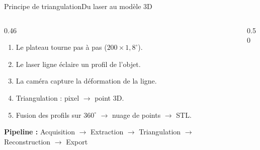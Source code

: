 \documentclass[aspectratio=169,10pt]{beamer}
\begin{document}
\begin{frame}{Principe de triangulation}{Du laser au mod\`{e}le 3D}
  \begin{columns}[T,onlytextwidth]
    \begin{column}{0.46\textwidth}
      \begin{enumerate}
        \item Le plateau tourne pas \`{a} pas ($200\times1{,}8^\circ$).
        \item Le laser ligne \'{e}claire un profil de l'objet.
        \item La cam\'{e}ra capture la d\'{e}formation de la ligne.
        \item Triangulation : pixel $\rightarrow$ point 3D.
        \item Fusion des profils sur $360^\circ$ $\rightarrow$ nuage de points $\rightarrow$ STL.
      \end{enumerate}

      \vspace{0.15cm}
      \footnotesize
      \textbf{Pipeline :} Acquisition $\rightarrow$ Extraction $\rightarrow$ Triangulation $\rightarrow$ Reconstruction $\rightarrow$ Export
    \end{column}
    \begin{column}{0.50\textwidth}
      \hspace{0.5cm}
      
    \end{column}
  \end{columns}
\end{frame}
\end{document}
